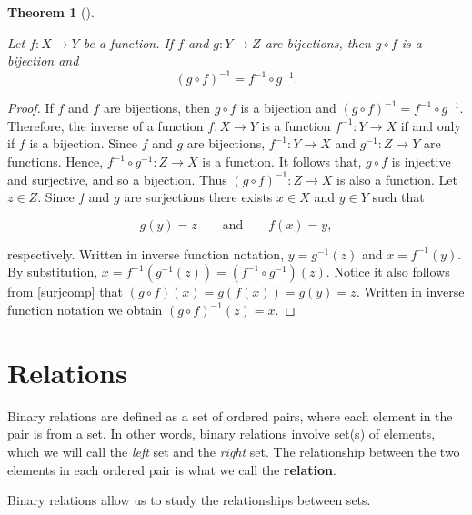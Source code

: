 \documentclass[
  letterpaper,
  10pt,
  reqno,
  twopage,
  openany]{book}
\theoremstyle{plain}
\theoremstyle{definition}
\theoremstyle{definition}
\theoremstyle{definition}
\theoremstyle{plain}
\theoremstyle{plain}
\newtheorem{theorem}{Theorem}[chapter]
\theoremstyle{remark}
\begin{document}
\leavevmode{}%
\begin{theorem}[]\label{thm-bijections}

Let \(f:X\to Y\) be a function. If \(f\) and \(g:Y\to Z\) are
bijections, then \(g\circ f\) is a bijection and \[
(g\circ f)^{-1}=f^{-1}\circ g^{-1}.
\]

\end{theorem}

\begin{proof}

If \(f\) and \(f\) are bijections, then \(g\circ f\) is a bijection and
\((g\circ f)^{-1}=f^{-1}\circ g^{-1}\). Therefore, the inverse of a
function \(f:X\to Y\) is a function \(f^{-1}:Y\to X\) if and only if
\(f\) is a bijection. Since \(f\) and \(g\) are bijections,
\(f^{-1}:Y\to X\) and \(g^{-1}:Z\to Y\) are functions. Hence,
\(f^{-1}\circ g^{-1}:Z\to X\) is a function. It follows that,
\(g\circ f\) is injective and surjective, and so a bijection. Thus
\((g\circ f)^{-1}:Z\to X\) is also a function. Let \(z\in Z\). Since
\(f\) and \(g\) are surjections there exists \(x\in X\) and \(y\in Y\)
such that

\begin{equation}
\label{surjcomp}
g(y)=z 
\qquad \text{and} \qquad 
f(x)=y, 
\end{equation}

respectively. Written in inverse function notation, \(y=g^{-1}(z)\) and
\(x=f^{-1}(y)\). By substitution,
\(x=f^{-1}(g^{-1}(z))=(f^{-1}\circ g^{-1})(z)\). Notice it also follows
from \eqref{surjcomp} that \((g\circ f)(x)=g(f(x))=g(y)=z\). Written in
inverse function notation we obtain \((g\circ f)^{-1}(z)=x\).

\end{proof}

\hypertarget{relations}{%
\section{Relations}\label{relations}}

Binary relations are defined as a set of ordered pairs, where each
element in the pair is from a set. In other words, binary relations
involve set(s) of elements, which we will call the \emph{left} set and
the \emph{right} set. The relationship between the two elements in each
ordered pair is what we call the \textbf{relation}.

Binary relations allow us to study the relationships between sets.
\end{document}
